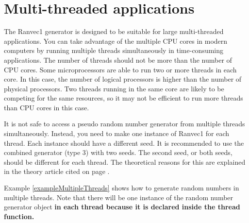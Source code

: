 \documentclass[11pt,a4paper,oneside,openright]{report}
\newcommand{\vspacesmall}{\vspace{3mm}}
\newcommand{\codei}[1]{\bfseries \ttfamily{#1}\normalfont}
\begin{document}
\section{Multi-threaded applications}\label{MultiThreadedApplications}
The Ranvec1 generator is designed to be suitable for large multi-threaded applications.
You can take advantage of the multiple CPU cores in modern computers by running multiple threads simultaneously in time-consuming applications. The number of threads should not be more than the number of CPU cores. Some microprocessors are able to run two or more threads in each core. In this case, the number of logical processors is higher than the number of physical processors.
Two threads running in the same core are likely to be competing for the same resources, so it may not be efficient to run more threads than CPU cores in this case.
\vspacesmall

It is not safe to access a pseudo random number generator from multiple threads simultaneously. Instead, you need to make one instance of Ranvec1 for each thread. Each instance should have a different seed. It is recommended to use the combined generator (type 3) with two seeds. The second seed, or both seeds, should be different for each thread. The theoretical reasons for this are explained in the theory article cited on page \pageref{Fog2015TheoryArticle}.
\vspacesmall

Example \ref{exampleMultipleThreads} shows how to generate random numbers in multiple threads. Note that there will be one instance of the random number generator object \codei{Ranvec1} in each thread because it is declared inside the thread function.

\vspacesmall
\end{document}
